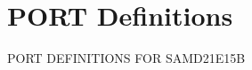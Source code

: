 \hypertarget{group___s_a_m_d21_e15_b__port}{}\section{P\+O\+RT Definitions}
\label{group___s_a_m_d21_e15_b__port}
P\+O\+RT D\+E\+F\+I\+N\+I\+T\+I\+O\+NS F\+OR S\+A\+M\+D21\+E15B 